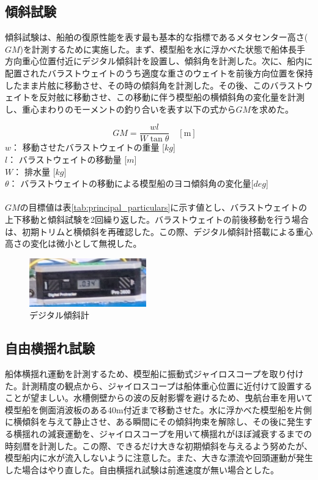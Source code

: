 \documentclass[dvipdfmx,a4paper]{jreport} %
\begin{document}
\subsection{傾斜試験}
傾斜試験は、船舶の復原性能を表す最も基本的な指標であるメタセンター高さ($GM$)を計測するために実施した。まず、模型船を水に浮かべた状態で船体長手方向重心位置付近にデジタル傾斜計を設置し、傾斜角を計測した。次に、船内に配置されたバラストウェイトのうち適度な重さのウェイトを前後方向位置を保持したまま片舷に移動させ、その時の傾斜角を計測した。その後、このバラストウェイトを反対舷に移動させ、この移動に伴う模型船の横傾斜角の変化量を計測し、重心まわりのモーメントの釣り合いを表す以下の式から$GM$を求めた。

$$ GM = \frac{w l}{W \tan \theta} \quad [\text{m}] \quad \text{} $$
$w$： 移動させたバラストウェイトの重量 [$kg$]\\
$l$： バラストウェイトの移動量 [$m$]\\
$W$： 排水量 [$kg$]\\
$\theta$： バラストウェイトの移動による模型船のヨコ傾斜角の変化量[$deg$]\\
\\
$GM$の目標値は表\ref{tab:principal_particulars}に示す値とし、バラストウェイトの上下移動と傾斜試験を2回繰り返した。バラストウェイトの前後移動を行う場合は、初期トリムと横傾斜を再確認した。この際、デジタル傾斜計搭載による重心高さの変化は微小として無視した。

 \begin{figure}[H] %
     \centering
     \includegraphics[width=0.45\textwidth]{summer/ship-experiment/long-pool/digital_inclinometer.png} %
     \caption{デジタル傾斜計}
     \label{fig:digital_inclinometer}
 \end{figure}


\subsection{自由横揺れ試験}
船体横揺れ運動を計測するため、模型船に振動式ジャイロスコープを取り付けた。計測精度の観点から、ジャイロスコープは船体重心位置に近付けて設置することが望ましい。水槽側壁からの波の反射影響を避けるため、曳航台車を用いて模型船を側面消波板のある40m付近まで移動させた。水に浮かべた模型船を片側に横傾斜を与えて静止させ、ある瞬間にその傾斜拘束を解除し、その後に発生する横揺れの減衰運動を、ジャイロスコープを用いて横揺れがほぼ減衰するまでの時刻暦を計測した。この際、できるだけ大きな初期傾斜を与えるよう努めたが、模型船内に水が流入しないように注意した。また、大きな漂流や回頭運動が発生した場合はやり直した。自由横揺れ試験は前進速度が無い場合とした。
\end{document}
